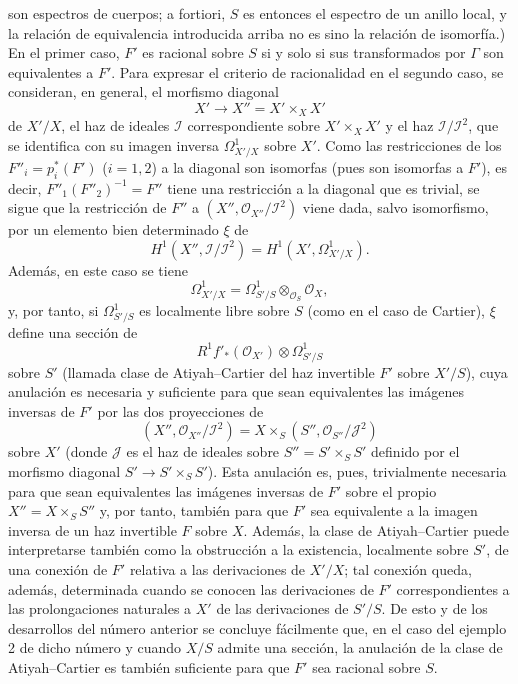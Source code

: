 \documentclass[11pt,twoside,openany]{book}
\numberwithin{equation}{section}
\newcommand{\src}[1]{%
  \phantomsection\hypertarget{src:#1}{}%
  \marginpar{\raggedleft\footnotesize\sffamily #1}%
}
\theoremstyle{plain}
\theoremstyle{definition}
\theoremstyle{remark}
\newcommand{\FgaUnitKey}{frontmatter}
\renewcommand{\src}[1]{%
  \phantomsection\hypertarget{src:\FgaUnitKey:#1}{}%
  \marginpar{\raggedleft\footnotesize\sffamily #1}%
}
\theoremstyle{plain}
\theoremstyle{definition}
\theoremstyle{remark}
\begin{document}
\src{323}
son espectros de cuerpos; a fortiori, $S$ es entonces el espectro de un anillo
local, y la relación de equivalencia introducida arriba no es sino la relación
de isomorfía.) En el primer caso, $F'$ es racional sobre $S$ si y solo si sus
transformados por $\Gamma$ son equivalentes a $F'$. Para expresar el criterio
de racionalidad en el segundo caso, se consideran, en general, el morfismo
diagonal
\[
  X'\longrightarrow X''=X'\times_XX'
\]
de $X'/X$, el haz de ideales $\mathcal I$ correspondiente sobre
$X'\times_XX'$ y el haz $\mathcal I/\mathcal I^2$, que se identifica con su
imagen inversa $\Omega^1_{X'/X}$ sobre $X'$. Como las restricciones de los
$F''_i=p_i^*(F')$ ($i=1,2$) a la diagonal son isomorfas (pues son isomorfas a
$F'$), es decir, $F''_1(F''_2)^{-1}=F''$ tiene una restricción a la diagonal
que es trivial, se sigue que la restricción de $F''$ a
$(X'',\mathcal O_{X''}/\mathcal I^2)$ viene dada, salvo isomorfismo, por un
elemento bien determinado $\xi$ de
\[
  H^1(X'',\mathcal I/\mathcal I^2)
  =H^1(X',\Omega^1_{X'/X}).
\]
Además, en este caso se tiene
\[
  \Omega^1_{X'/X}
  =\Omega^1_{S'/S}\otimes_{\mathcal O_S}\mathcal O_X,
\]
y, por tanto, si $\Omega^1_{S'/S}$ es localmente libre sobre $S$ (como en el
caso de Cartier), $\xi$ define una sección de
\[
  R^1f'_*(\mathcal O_{X'})\otimes\Omega^1_{S'/S}
\]
sobre $S'$ (llamada clase de Atiyah--Cartier del haz invertible $F'$ sobre
$X'/S$), cuya anulación es necesaria y suficiente para que sean equivalentes
las imágenes inversas de $F'$ por las dos proyecciones de
\[
  (X'',\mathcal O_{X''}/\mathcal I^2)
  =X\times_S(S'',\mathcal O_{S''}/\mathcal J^2)
\]
sobre $X'$ (donde $\mathcal J$ es el haz de ideales sobre
$S''=S'\times_SS'$ definido por el morfismo diagonal
$S'\longrightarrow S'\times_SS'$). Esta anulación es, pues, trivialmente
necesaria para que sean equivalentes las imágenes inversas de $F'$ sobre el
propio $X''=X\times_SS''$ y, por tanto, también para que $F'$ sea equivalente
a la imagen inversa de un haz invertible $F$ sobre $X$. Además, la clase de
Atiyah--Cartier puede interpretarse también como la obstrucción a la existencia,
localmente sobre $S'$, de una conexión de $F'$ relativa a las derivaciones de
$X'/X$; tal conexión queda, además, determinada cuando se conocen las
derivaciones de $F'$ correspondientes a las prolongaciones naturales a $X'$ de
las derivaciones de $S'/S$. De esto y de los desarrollos del número anterior se
concluye fácilmente que, en el caso del ejemplo 2 de dicho número y cuando
$X/S$ admite una sección, la anulación de la clase de Atiyah--Cartier es también
suficiente para que $F'$ sea racional sobre $S$.
\end{document}
